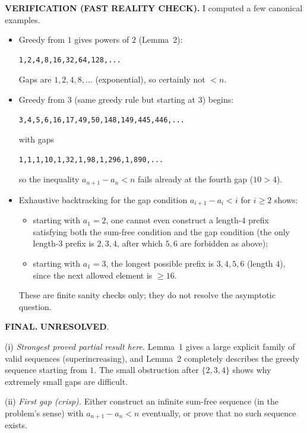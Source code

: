 \medskip
\noindent\textbf{VERIFICATION (FAST REALITY CHECK).}
I computed a few canonical examples.
\begin{itemize}
\item Greedy from $1$ gives powers of $2$ (Lemma~2):
\begin{verbatim}
1,2,4,8,16,32,64,128,...
\end{verbatim}
Gaps are $1,2,4,8,\dots$ (exponential), so certainly not $<n$.

\item Greedy from $3$ (same greedy rule but starting at $3$) begins:
\begin{verbatim}
3,4,5,6,16,17,49,50,148,149,445,446,...
\end{verbatim}
with gaps
\begin{verbatim}
1,1,1,10,1,32,1,98,1,296,1,890,...
\end{verbatim}
so the inequality $a_{n+1}-a_n<n$ fails already at the fourth gap ($10>4$).

\item Exhaustive backtracking for the gap condition $a_{i+1}-a_i<i$ for $i\ge 2$ shows:
\begin{itemize}
\item starting with $a_1=2$, one cannot even construct a length-$4$ prefix satisfying both the sum-free condition and the gap condition (the only length-$3$ prefix is $2,3,4$, after which $5,6$ are forbidden as above);
\item starting with $a_1=3$, the longest possible prefix is $3,4,5,6$ (length $4$), since the next allowed element is $\ge 16$.
\end{itemize}
These are finite sanity checks only; they do not resolve the asymptotic question.
\end{itemize}

\medskip
\noindent\textbf{FINAL.} \textbf{UNRESOLVED}.

\noindent(i) \emph{Strongest proved partial result here.}
Lemma~1 gives a large explicit family of valid sequences (superincreasing), and Lemma~2 completely describes the greedy sequence starting from $1$.
The small obstruction after $\{2,3,4\}$ shows why extremely small gaps are difficult.

\noindent(ii) \emph{First gap (crisp).}
Either construct an infinite sum-free sequence (in the problem's sense) with $a_{n+1}-a_n<n$ eventually, or prove that no such sequence exists.

